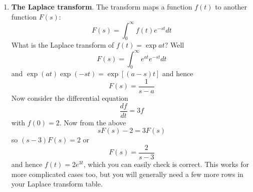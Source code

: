 \documentclass[11pt,a4paper]{scrartcl}
\begin{document}
\begin{enumerate}
       \item \textbf{The Laplace transform}. The transform maps a function $f(t)$ to another function $F(s)$:
         \begin{equation}
           F(s)=\int_0^\infty f(t)e^{-st}dt
         \end{equation}
         What is the Laplace transform of $f(t)=\exp{at}$? Well
         \begin{equation}
           F(s)=\int_0^\infty e^{at}e^{-st}dt
         \end{equation}
         and $\exp{(at)}\exp{(-st)}=\exp{[(a-s)t]}$ and hence
         \begin{equation}
           F(s)=\frac{1}{s-a}
         \end{equation}
         Now consider the differential equation
         \begin{equation}
           \frac{df}{dt}=3f
         \end{equation}
         with $f(0)=2$. Now from the above
         \begin{equation}
           sF(s)-2=3F(s)
         \end{equation}
         so $(s-3)F(s)=2$ or
         \begin{equation}
           F(s)=\frac{2}{s-3}
         \end{equation}
         and hence $f(t)=2e^{3t}$, which you can easily check is correct. This works for more complicated cases too, but you will generally need a few more rows in your Laplace transform table.
        
\end{enumerate}
\end{document}
